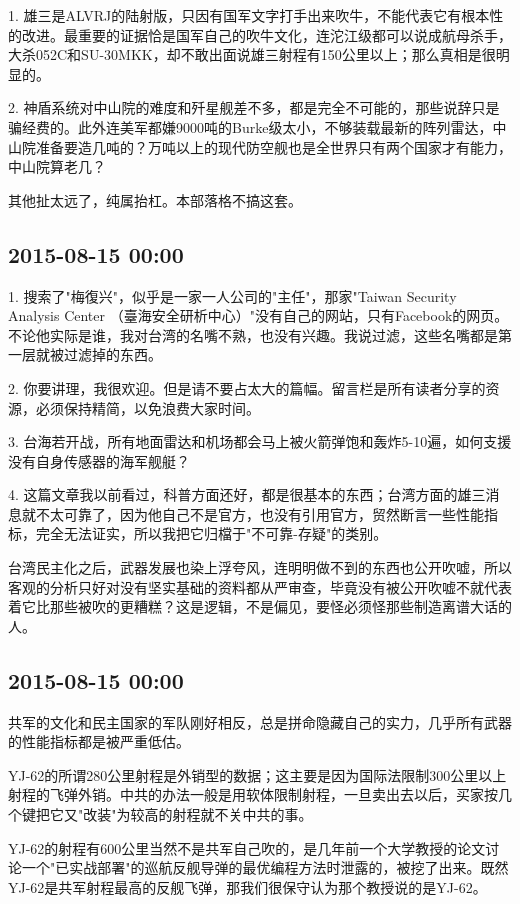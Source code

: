 \documentclass[twocolumn]{ctexart}
\begin{document}
1. 雄三是ALVRJ的陆射版，只因有国军文字打手出来吹牛，不能代表它有根本性的改进。最重要的证据恰是国军自己的吹牛文化，连沱江级都可以说成航母杀手，大杀052C和SU-30MKK，却不敢出面说雄三射程有150公里以上；那么真相是很明显的。

2. 神盾系统对中山院的难度和歼星舰差不多，都是完全不可能的，那些说辞只是骗经费的。此外连美军都嫌9000吨的Burke级太小，不够装载最新的阵列雷达，中山院准备要造几吨的？万吨以上的现代防空舰也是全世界只有两个国家才有能力，中山院算老几？

其他扯太远了，纯属抬杠。本部落格不搞这套。

\subsection*{2015-08-15 00:00}
1. 搜索了"梅復兴"，似乎是一家一人公司的"主任"，那家"Taiwan Security Analysis Center （臺海安全研析中心）"没有自己的网站，只有Facebook的网页。不论他实际是谁，我对台湾的名嘴不熟，也没有兴趣。我说过滤，这些名嘴都是第一层就被过滤掉的东西。

2. 你要讲理，我很欢迎。但是请不要占太大的篇幅。留言栏是所有读者分享的资源，必须保持精简，以免浪费大家时间。

3. 台海若开战，所有地面雷达和机场都会马上被火箭弹饱和轰炸5-10遍，如何支援没有自身传感器的海军舰艇？

4. 这篇文章我以前看过，科普方面还好，都是很基本的东西；台湾方面的雄三消息就不太可靠了，因为他自己不是官方，也没有引用官方，贸然断言一些性能指标，完全无法证实，所以我把它归檔于"不可靠-存疑"的类别。

台湾民主化之后，武器发展也染上浮夸风，连明明做不到的东西也公开吹嘘，所以客观的分析只好对没有坚实基础的资料都从严审查，毕竟没有被公开吹嘘不就代表着它比那些被吹的更糟糕？这是逻辑，不是偏见，要怪必须怪那些制造离谱大话的人。\subsection*{2015-08-15 00:00}
共军的文化和民主国家的军队刚好相反，总是拼命隐藏自己的实力，几乎所有武器的性能指标都是被严重低估。

YJ-62的所谓280公里射程是外销型的数据；这主要是因为国际法限制300公里以上射程的飞弹外销。中共的办法一般是用软体限制射程，一旦卖出去以后，买家按几个键把它又"改装"为较高的射程就不关中共的事。

YJ-62的射程有600公里当然不是共军自己吹的，是几年前一个大学教授的论文讨论一个"已实战部署"的巡航反舰导弹的最优编程方法时泄露的，被挖了出来。既然YJ-62是共军射程最高的反舰飞弹，那我们很保守认为那个教授说的是YJ-62。
\end{document}
